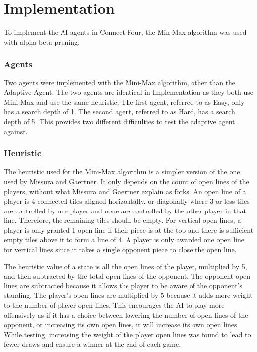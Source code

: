 \documentclass[12pt]{article}
\begin{document}
\section*{Implementation}
To implement the AI agents in Connect Four, the Min-Max algorithm was used with alpha-beta pruning.

\subsubsection*{Agents}
Two agents were implemented with the Mini-Max algorithm, other than the Adaptive Agent. The two agents are identical in Implementation as they both use Mini-Max and use the same heuristic. The first agent, referred to as Easy, only has a search depth of 1. The second agent, referred to as Hard, has a search depth of 5. This provides two different difficulties to test the adaptive agent against.

\subsubsection*{Heuristic}
The heuristic used for the Mini-Max algorithm is a simpler version of the one used by Missura and Gaertner. It only depends on the count of open lines of the players, without what Missura and Gaertner explain as forks. An open line of a player is 4 connected tiles aligned horizontally, or diagonally where 3 or less tiles are controlled by one player and none are controlled by the other player in that line. Therefore, the remaining tiles should be empty. For vertical open lines, a player is only granted 1 open line if their piece is at the top and there is sufficient empty tiles above it to form a line of 4. A player is only awarded one open line for vertical lines since it takes a single opponent piece to close the open line.

The heuristic value of a state is all the open lines of the player, multiplied by 5, and then subtracted by the total open lines of the opponent. The opponent open lines are subtracted because it allows the player to be aware of the opponent's standing. The player's open lines are multiplied by 5 because it adds more weight to the number of player open lines. This encourages the AI to play more offensively as if it has a choice between lowering the number of open lines of the opponent, or increasing its own open lines, it will increase its own open lines. While testing, increasing the weight of the player open lines was found to lead to fewer draws and ensure a winner at the end of each game.
\end{document}
